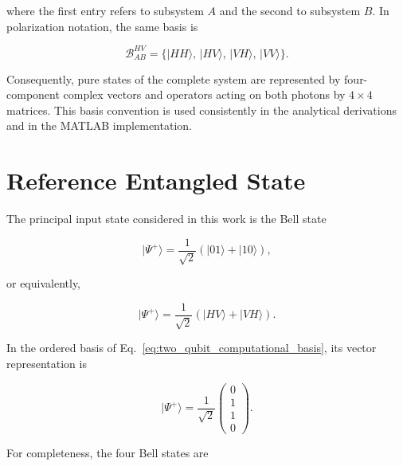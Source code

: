 where the first entry refers to subsystem \(A\) and the second to subsystem \(B\).
In polarization notation, the same basis is

\begin{equation}
\mathcal{B}^{HV}_{AB}
=
\{
|HH\rangle,\,
|HV\rangle,\,
|VH\rangle,\,
|VV\rangle
\}.
\label{eq:two_qubit_computational_basis_HV}
\end{equation}

Consequently, pure states of the complete system are represented by four-component
complex vectors and operators acting on both photons by \(4\times4\) matrices.
This basis convention is used consistently in the analytical derivations and in
the MATLAB implementation.


\section{Reference Entangled State}
\label{sec:reference_entangled_state}

The principal input state considered in this work is the Bell state

\begin{equation}
|\Psi^{+}\rangle
=
\frac{1}{\sqrt{2}}
\left(
|01\rangle+|10\rangle
\right),
\label{eq:bell_psi_plus}
\end{equation}

or equivalently,

\begin{equation}
|\Psi^{+}\rangle
=
\frac{1}{\sqrt{2}}
\left(
|HV\rangle
+
|VH\rangle
\right).
\label{eq:bell_psi_plus_polarization}
\end{equation}

In the ordered basis of Eq.~\eqref{eq:two_qubit_computational_basis}, its vector
representation is

\begin{equation}
|\Psi^{+}\rangle
=
\frac{1}{\sqrt{2}}
\begin{pmatrix}
0\\
1\\
1\\
0
\end{pmatrix}.
\label{eq:bell_psi_plus_vector}
\end{equation}

For completeness, the four Bell states are

